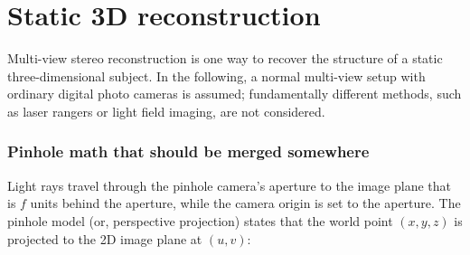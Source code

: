 
\clearpage
\section{Static 3D reconstruction}

Multi-view stereo reconstruction is one way to recover the structure of a static three-dimensional subject.
In the following, a normal multi-view setup with ordinary digital photo cameras is assumed;
fundamentally different methods, such as laser rangers or light field imaging, are not considered.














\subsubsection{Pinhole math that should be merged somewhere} %

Light rays travel through the pinhole camera's aperture to the image plane that is $f$ units behind the aperture, while the camera origin is set to the aperture.
The pinhole model (or, perspective projection) states that the world point $(x, y, z)$ is projected to the 2D image plane at $(u, v)$:

